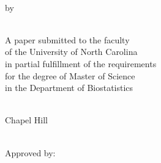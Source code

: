 \documentclass{biosmasters}
\makeatletter
\let\thetitle\@title
\let\theauthor\@author
\let\thedate\@date
\makeatother
\begin{document}
\begin{titlepage}


\begin{center} %


\thetitle \\[1cm] %


by\\[1cm]

\theauthor \\[1cm]

\begin{minipage}{0.8\textwidth}
\begin{center}
A paper submitted to the faculty \\
of the University of North Carolina \\
in partial fulfillment of the requirements \\
for the degree of Master of Science \\
in the Department of Biostatistics
\end{center}
\end{minipage}\\[1cm]

Chapel Hill \\[1cm]


\thedate\\[3cm] %


\begin{minipage}{0.4\textwidth}
\begin{flushleft}\end{flushleft}
\end{minipage}
\begin{minipage}{0.4\textwidth}
\begin{flushleft}
Approved by:\\[1cm]


\end{flushleft}
\end{minipage}
\end{center}
\end{titlepage}
\end{document}
